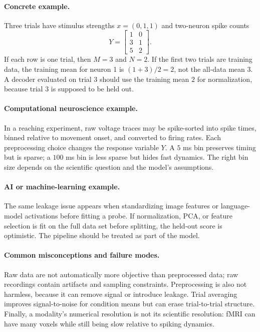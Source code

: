 \paragraph{Concrete example.}
Three trials have stimulus strengths \(x=(0,1,1)\) and two-neuron spike counts
\[
Y=
\begin{bmatrix}
1&0\\
3&1\\
5&2
\end{bmatrix}.
\]
If each row is one trial, then \(M=3\) and \(N=2\). If the first two trials are training data, the training mean for neuron 1 is \((1+3)/2=2\), not the all-data mean \(3\). A decoder evaluated on trial 3 should use the training mean \(2\) for normalization, because trial 3 is supposed to be held out.

\paragraph{Computational neuroscience example.}
In a reaching experiment, raw voltage traces may be spike-sorted into spike times, binned relative to movement onset, and converted to firing rates. Each preprocessing choice changes the response variable \(Y\). A \(5\) ms bin preserves timing but is sparse; a \(100\) ms bin is less sparse but hides fast dynamics. The right bin size depends on the scientific question and the model's assumptions.

\paragraph{AI or machine-learning example.}
The same leakage issue appears when standardizing image features or language-model activations before fitting a probe. If normalization, PCA, or feature selection is fit on the full data set before splitting, the held-out score is optimistic. The pipeline should be treated as part of the model.

\paragraph{Common misconceptions and failure modes.}
Raw data are not automatically more objective than preprocessed data; raw recordings contain artifacts and sampling constraints. Preprocessing is also not harmless, because it can remove signal or introduce leakage. Trial averaging improves signal-to-noise for condition means but can erase trial-to-trial structure. Finally, a modality's numerical resolution is not its scientific resolution: fMRI can have many voxels while still being slow relative to spiking dynamics.

